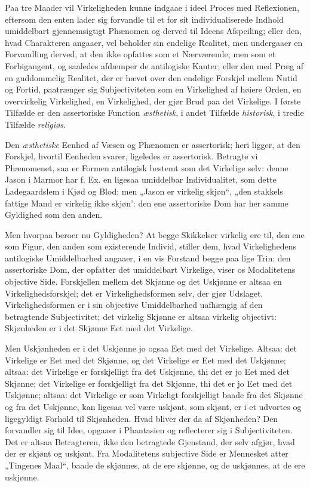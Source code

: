 \documentclass[12pt]{book}
\newcommand{\opage}[1]{\marginnote{\footnotesize\textit{[#1]}}}
\begin{document}
Paa tre Maader vil Virkeligheden kunne indgaae i ideel
Proces med Reflexionen, eftersom den enten lader sig forvandle
til et for sit individualiserede Indhold umiddelbart
gjennemsigtigt Phænomen og derved til Ideens Afspeiling; eller
den, hvad Charakteren angaaer, vel beholder sin endelige Realitet,
men undergaaer en Forvandling derved, at den ikke
opfattes som et Nærværende, men som et Forbigangent, og
saaledes afdæmper de antilogiske Kanter; eller den med Præg
af en guddommelig Realitet, der er hævet over den endelige Forskjel
mellem Nutid og Fortid, paatrænger sig Subjectiviteten
som en Virkelighed af høiere Orden, en overvirkelig Virkelighed,
en Virkelighed, der gjør Brud paa det Virkelige.
I første Tilfælde er den assertoriske Function \emph{æsthetisk}, i
andet Tilfælde \emph{historisk}, i tredie Tilfælde \emph{religiøs}.

Den \emph{æsthetiske} Eenhed af Væsen og Phænomen er assertorisk;
heri ligger, at den Forskjel, hvortil Eenheden svarer,
ligeledes er assertorisk. Betragte vi Phænomenet, saa er
Formen antilogisk bestemt som det Virkelige selv: denne Jason
i Marmor har f. Ex. en ligesaa umiddelbar Individualitet,
som dette Ladegaardslem i Kjød og Blod; men „Jason er
virkelig skjøn“, „den stakkels fattige Mand er virkelig ikke
skjøn': den ene assertoriske Dom har her samme Gyldighed %
som den anden.

Men hvorpaa beroer nu Gyldigheden? At begge Skikkelser
virkelig ere til, den ene som Figur, den anden som existerende
Individ, stiller dem, hvad Virkelighedens antilogiske Umiddelbarhed
angaaer, i en vis Forstand begge paa lige Trin: den
assertoriske Dom, der opfatter det umiddelbart Virkelige, viser
os Modalitetens objective Side. Forskjellen mellem det
Skjønne og det Uskjønne er altsaa en Virkelighedsforskjel; det
er Virkelighedsformen selv, der gjør Udslaget. Virkelighedsformen
er i sin objective Umiddelbarhed uafhængig af den
\opage{203}betragtende Subjectivitet; det virkelig Skjønne er altsaa
virkelig objectivt: Skjønheden er i det Skjønne Eet med det
Virkelige.

Men Uskjønheden er i det Uskjønne jo ogsaa Eet med
det Virkelige. Altsaa: det Virkelige er Eet med det Skjønne,
og det Virkelige er Eet med det Uskjønne; altsaa: det Virkelige
er forskjelligt fra det Uskjønne, thi det er jo Eet med det
Skjønne; det Virkelige er forskjelligt fra det Skjønne, thi det
er jo Eet med det Uskjønne; altsaa: det Virkelige er som
Virkeligt forskjelligt baade fra det Skjønne og fra det Uskjønne,
kan ligesaa vel være uskjønt, som skjønt, er i et udvortes og
ligegyldigt Forhold til Skjønheden. Hvad bliver der da af
Skjønheden? Den forvandler sig til Idee, opgaaer i Phantasien
og reflecterer sig i Subjectiviteten. Det er altsaa Betragteren,
ikke den betragtede Gjenstand, der selv afgjør, hvad
der er skjønt og uskjønt. Fra Modalitetens subjective Side
er Mennesket atter „Tingenes Maal“, baade de skjønnes, at
de ere skjønne, og de uskjønnes, at de ere uskjønne.
\end{document}
